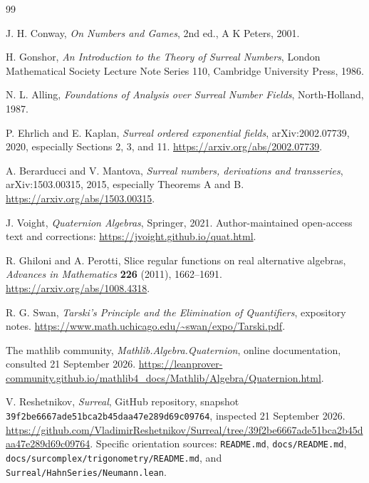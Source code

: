 \documentclass[11pt,letterpaper]{article}
\theoremstyle{definition}
\begin{document}
\clearpage
{}
{}
\begin{thebibliography}{99}
\raggedright

J. H. Conway, \emph{On Numbers and Games}, 2nd ed., A K Peters, 2001.

H. Gonshor, \emph{An Introduction to the Theory of Surreal Numbers},
London Mathematical Society Lecture Note Series 110, Cambridge University
Press, 1986.

N. L. Alling, \emph{Foundations of Analysis over Surreal Number Fields},
North-Holland, 1987.

P. Ehrlich and E. Kaplan, \emph{Surreal ordered exponential fields},
arXiv:2002.07739, 2020, especially Sections 2, 3, and 11.
\url{https://arxiv.org/abs/2002.07739}.

A. Berarducci and V. Mantova, \emph{Surreal numbers, derivations and
transseries}, arXiv:1503.00315, 2015, especially Theorems A and B.
\url{https://arxiv.org/abs/1503.00315}.

J. Voight, \emph{Quaternion Algebras}, Springer, 2021. Author-maintained
open-access text and corrections:
\url{https://jvoight.github.io/quat.html}.

R. Ghiloni and A. Perotti, Slice regular functions on real alternative algebras,
\emph{Advances in Mathematics} \textbf{226} (2011), 1662--1691.
\url{https://arxiv.org/abs/1008.4318}.

R. G. Swan, \emph{Tarski's Principle and the Elimination of Quantifiers},
expository notes.
\url{https://www.math.uchicago.edu/~swan/expo/Tarski.pdf}.

The mathlib community, \emph{Mathlib.Algebra.Quaternion}, online documentation,
consulted 21 September 2026.
\url{https://leanprover-community.github.io/mathlib4_docs/Mathlib/Algebra/Quaternion.html}.

V. Reshetnikov, \emph{Surreal}, GitHub repository, snapshot
\texttt{39f2be6667ade51bca2b45daa47e289d69c09764}, inspected 21 September 2026.
\url{https://github.com/VladimirReshetnikov/Surreal/tree/39f2be6667ade51bca2b45daa47e289d69c09764}.
Specific orientation sources: \texttt{README.md}, \texttt{docs/README.md},
\texttt{docs/surcomplex/trigonometry/README.md}, and
\texttt{Surreal/HahnSeries/Neumann.lean}.

\end{thebibliography}
\end{document}
